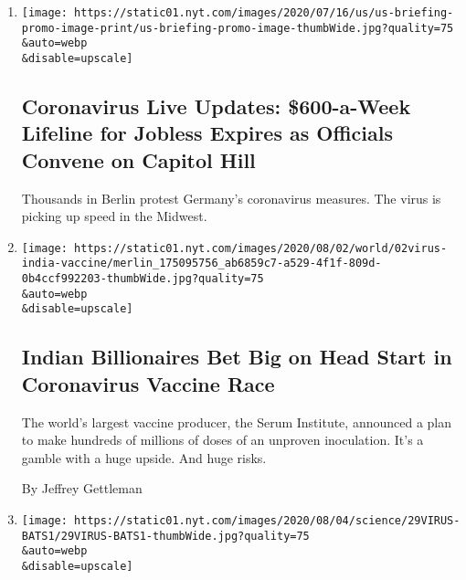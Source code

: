 \begin{enumerate}
\def\labelenumi{\arabic{enumi}.}
\item
  \href{/2020/08/01/world/coronavirus-covid-19.html}{}

  \texttt{[image: https://static01.nyt.com/images/2020/07/16/us/us-briefing-promo-image-print/us-briefing-promo-image-thumbWide.jpg?quality=75\\\&auto=webp\\\&disable=upscale]}

  \hypertarget{coronavirus-live-updates-600-a-week-lifeline-for-jobless-expires-as-officials-convene-on-capitol-hill}{%
  \subsection{Coronavirus Live Updates: \$600-a-Week Lifeline for
  Jobless Expires as Officials Convene on Capitol
  Hill}\label{coronavirus-live-updates-600-a-week-lifeline-for-jobless-expires-as-officials-convene-on-capitol-hill}}

  Thousands in Berlin protest Germany's coronavirus measures. The virus
  is picking up speed in the Midwest.
\item
  \href{/2020/08/01/world/asia/coronavirus-vaccine-india.html}{}

  \texttt{[image: https://static01.nyt.com/images/2020/08/02/world/02virus-india-vaccine/merlin\_175095756\_ab6859c7-a529-4f1f-809d-0b4ccf992203-thumbWide.jpg?quality=75\\\&auto=webp\\\&disable=upscale]}

  \hypertarget{indian-billionaires-bet-big-on-head-start-in-coronavirus-vaccine-race}{%
  \subsection{Indian Billionaires Bet Big on Head Start in Coronavirus
  Vaccine
  Race}\label{indian-billionaires-bet-big-on-head-start-in-coronavirus-vaccine-race}}

  The world's largest vaccine producer, the Serum Institute, announced a
  plan to make hundreds of millions of doses of an unproven inoculation.
  It's a gamble with a huge upside. And huge risks.

  By Jeffrey Gettleman
\item
  \href{/2020/08/01/science/Covid-bats.html}{}

  \texttt{[image: https://static01.nyt.com/images/2020/08/04/science/29VIRUS-BATS1/29VIRUS-BATS1-thumbWide.jpg?quality=75\\\&auto=webp\\\&disable=upscale]}

  \hypertarget{can-humans-give-coronavirus-to-bats-and-other-wildlife}{%
}
\end{enumerate}
